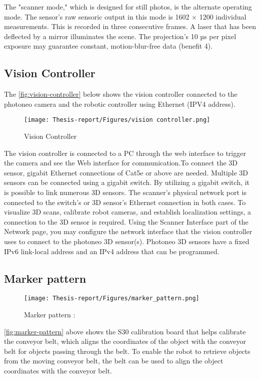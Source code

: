 \documentclass[12pt]{article}
\begin{document}
The "scanner mode," which is designed for still photos, is the alternate operating mode.
 The sensor's raw sensoric output in this mode is 1602 × 1200 individual measurements. This is recorded in three consecutive frames. A laser that has been deflected by a mirror illuminates the scene.  The projection's 10 µs per pixel exposure may guarantee constant, motion-blur-free data (benefit 4)\cite{ref15}.


\subsection{Vision Controller}
The \autoref{fig:vision-controller} below shows the vision controller connected to the photoneo camera and the robotic controller using Ethernet (IPV4 address).
\begin{figure}[h]
    \centering
    \texttt{[image: Thesis-report/Figures/vision controller.png]}
    \caption{Vision Controller \cite{ref2}}
    \label{fig:vision-controller}
\end{figure}
The vision controller is connected to a PC through the web interface to trigger the camera and see the Web interface for communication.To connect the 3D sensor, gigabit Ethernet connections of Cat5e or above are needed.  Multiple 3D sensors can be connected using a gigabit switch.  By utilizing a gigabit switch, it is possible to link numerous 3D sensors.  The scanner's physical network port is connected to the switch's or 3D sensor's Ethernet connection in both cases. To visualize 3D scans, calibrate robot cameras, and establish localization settings, a connection to the 3D sensor is required. Using the Scanner Interface part of the Network page, you may configure the network interface that the vision controller uses to connect to the photoneo 3D sensor(s).  Photoneo 3D sensors have a fixed IPv6 link-local address and an IPv4 address that can be programmed.\cite{ref15}

\subsection{Marker pattern}
\begin{figure}[h]
    \centering
    \texttt{[image: Thesis-report/Figures/marker\_pattern.png]}
    \caption{Marker pattern \cite{ref2}:}
    \label{fig:marker-pattern}
\end{figure}

 \autoref{fig:marker-pattern} above shows the S30 calibration board that helps calibrate the conveyor belt, which aligns the coordinates of the object with the conveyor belt for objects passing through the belt. To enable the robot to retrieve objects from the moving conveyor belt, the belt can be used to align the object coordinates with the conveyor belt\cite{ref2}.
\end{document}
